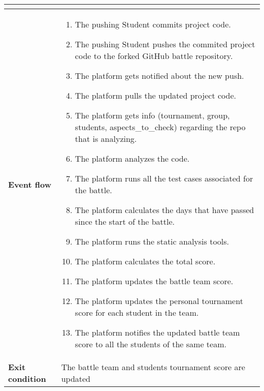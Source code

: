 \begin{enumerate}[label=\textbf{UC\arabic*}:,ref=UC\arabic*,leftmargin=1.3cm]
{\begin{table}[H]
\begin{tabular}{|l|p{11.9cm}|}
\begin{itemize}
                        \end{itemize}                                                                                        \\\hline
                        \textbf{Event flow}      &
                        \begin{enumerate}[label=\arabic*.]
                              \item The pushing Student commits project code.
                              \item The pushing Student pushes the commited project code to the forked GitHub battle repository.
                              \item The platform gets notified about the new push.
                              \item The platform pulls the updated project code.
                              \item The platform gets info (tournament, group, students, aspects_to_check) regarding the repo that is analyzing.
                              \item The platform analyzes the code.
                              \item The platform runs all the test cases associated for the battle.
                              \item The platform calculates the days that have passed since the start of the battle.
                              \item The platform runs the static analysis tools.
                              \item The platform calculates the total score.
                              \item The platform updates the battle team score.
                              \item The platform updates the personal tournament score for each student in the team.
                              \item The platform notifies the updated battle team score to all the students of the same team.
                        \end{enumerate}                                                       \\\hline
                        \textbf{Exit condition}  & The battle team and students tournament score are updated                                                                                    \\\hline

\end{tabular}
\end{table}}
\end{enumerate}
